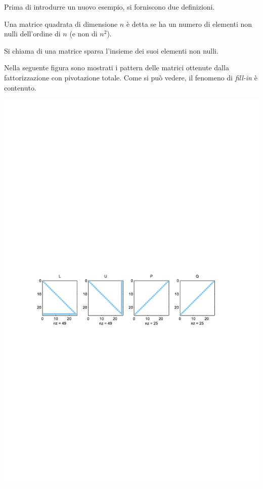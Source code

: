 \highspace
Prima di introdurre un nuovo esempio, si forniscono due definizioni.

\begin{definitionbox}
    Una matrice quadrata di dimensione $n$ è detta  se ha un numero di elementi non nulli dell'ordine di $n$ (e non di $n^{2}$).
\end{definitionbox}

\begin{definitionbox}
    Si chiama  di una matrice sparsa l'insieme dei suoi elementi non nulli.
\end{definitionbox}

\begin{examplebox}
    Nella seguente figura sono mostrati i pattern delle matrici ottenute dalla fattorizzazione con pivotazione totale. Come si può vedere, il fenomeno di \emph{fill-in} è contenuto.

    \highspace
    \centering
    \includegraphics[width=\textwidth]{img/fill_in_3.pdf}


\end{examplebox}
